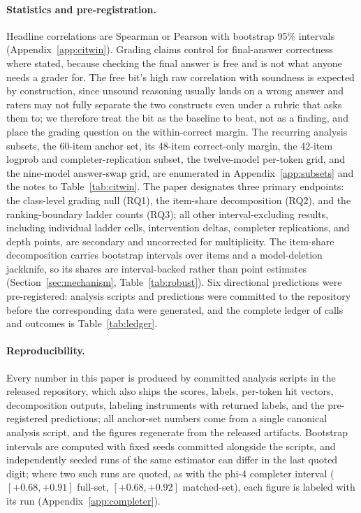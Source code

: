 \paragraph{Statistics and pre-registration.}
Headline correlations are Spearman or Pearson with bootstrap 95\% intervals (Appendix~\ref{app:citwin}).
Grading claims control for final-answer correctness where stated, because checking the final answer is free and is not what anyone needs a grader for.
The free bit's high raw correlation with soundness is expected by construction, since unsound reasoning usually lands on a wrong answer and raters may not fully separate the two constructs even under a rubric that asks them to; we therefore treat the bit as the baseline to beat, not as a finding, and place the grading question on the within-correct margin.
The recurring analysis subsets, the 60-item anchor set, its 48-item correct-only margin, the 42-item logprob and completer-replication subset, the twelve-model per-token grid, and the nine-model answer-swap grid, are enumerated in Appendix~\ref{app:subsets} and the notes to Table~\ref{tab:citwin}.
The paper designates three primary endpoints: the class-level grading null (RQ1), the item-share decomposition (RQ2), and the ranking-boundary ladder counts (RQ3); all other interval-excluding results, including individual ladder cells, intervention deltas, completer replications, and depth points, are secondary and uncorrected for multiplicity.
The item-share decomposition carries bootstrap intervals over items and a model-deletion jackknife, so its shares are interval-backed rather than point estimates (Section~\ref{sec:mechanism}, Table~\ref{tab:robust}).
Six directional predictions were pre-registered: analysis scripts and predictions were committed to the repository before the corresponding data were generated, and the complete ledger of calls and outcomes is Table~\ref{tab:ledger}.

\paragraph{Reproducibility.}
Every number in this paper is produced by committed analysis scripts in the released repository, which also ships the scores, labels, per-token hit vectors, decomposition outputs, labeling instruments with returned labels, and the pre-registered predictions; all anchor-set numbers come from a single canonical analysis script, and the figures regenerate from the released artifacts.
Bootstrap intervals are computed with fixed seeds committed alongside the scripts, and independently seeded runs of the same estimator can differ in the last quoted digit; where two such runs are quoted, as with the phi-4 completer interval ($[+0.68, +0.91]$ full-set, $[+0.68, +0.92]$ matched-set), each figure is labeled with its run (Appendix~\ref{app:completer}).
